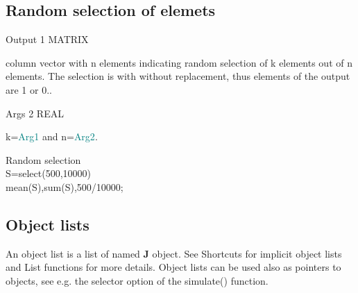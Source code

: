 \subsection{Random selection of elemets}
\label{select}
\vspace{0.3cm}
\hline
\vspace{0.3cm}
\noindent Output \tabto{3cm} 1 \tabto{5cm}  MATRIX  \tabto{7cm}
\begin{changemargin}{3cm}{0cm}
\noindent column vector with n elements indicating random
selection of k
elements out of n elements. The selection is with without replacement,
thus elements of the output are 1 or 0..
\end{changemargin}
\vspace{0.3cm}
\hline
\vspace{0.3cm}
\noindent Args \tabto{3cm} 2 \tabto{5cm}  REAL \tabto{7cm}
\begin{changemargin}{3cm}{0cm}
\noindent  k=\textcolor{teal}{Arg1} and n=\textcolor{teal}{Arg2}.
\end {changemargin}
\hline
\vspace{0.2cm}
\begin{example}[selectex]Random selection\\
\label{selectex}
S=\textcolor{VioletRed}{select}(500,10000)\\
\textcolor{VioletRed}{mean}(S),\textcolor{VioletRed}{sum}(S),500/10000;
\end{example}
\subsection{Object lists}
\label{listo}
An object list is a list of named \textbf{J} object. See Shortcuts for implicit object
lists and List functions for more details. Object lists can be used also as
pointers to objects, see e.g. the selector option of the simulate() function.

